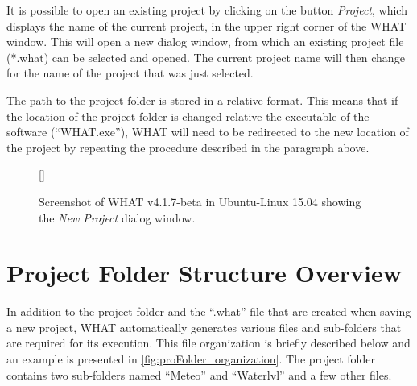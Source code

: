 \documentclass[WHATMANUAL.tex]{subfiles}
\begin{document}
It is possible to open an existing project by clicking on the button \emph{Project}, which displays the name of the current project, in the upper right corner of the WHAT window. This will open a new dialog window, from which an existing project file (*.what) can be selected and opened. The current project name will then change for the name of the project that was just selected.

The path to the project folder is stored in a relative format. This means that if the location of the project folder is changed relative the executable of the software (``WHAT.exe''),  WHAT will need to be redirected to the new location of the project by repeating the procedure described in the paragraph above.

\begin{figure}[!ht]
    \setlength{\fboxsep}{0pt}
    [\FBwidth]
	{
	 \caption{Screenshot of WHAT v4.1.7-beta in Ubuntu-Linux 15.04 showing the \emph{New Project} dialog window.}
	 \label{fig:new_proj_win}
	}
	{
	}
\end{figure}

\section{Project Folder Structure Overview}\label{subsec:folder_structure}

In addition to the project folder and the ``.what'' file that are created when saving a new project, WHAT automatically generates various files and sub-folders that are required for its execution. This file organization is briefly described below and an example is presented in \cref{fig:proFolder_organization}. The project folder contains two sub-folders named ``Meteo'' and ``Waterlvl'' and a few other files.
\end{document}
